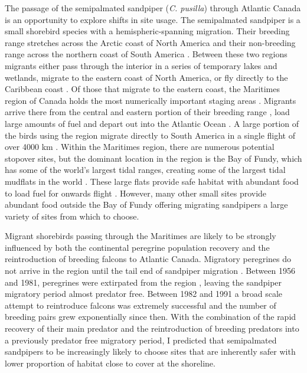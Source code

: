 The passage of the semipalmated sandpiper (\textit{C. pusilla}) through Atlantic Canada is an opportunity to explore shifts in site usage. The semipalmated sandpiper is a small shorebird species with a hemispheric-spanning migration. Their breeding range stretches across the Arctic coast of North America and their non-breeding range across the northern coast of South America \citep{hicklin2010semipalmated}. Between these two regions migrants either pass through the interior in a series of temporary lakes and wetlands, migrate to the eastern coast of North America, or fly directly to the Caribbean coast \citep{Brown2017}. Of those that migrate to the eastern coast, the Maritimes region of Canada holds the most numerically important staging areas \citep{Hicklin87}. Migrants arrive there from the central and eastern portion of their breeding range \citep{Brown2017}, load large amounts of fuel and depart out into the Atlantic Ocean \citep{Lank1983}. A large portion of the birds using the region migrate directly to South America in a single flight of over 4000 km \citep{Lank1979,Brown2017}. Within the Maritimes region, there are numerous potential stopover sites, but the dominant location in the region is the Bay of Fundy, which has some of the world's largest tidal ranges, creating some of the largest tidal mudflats in the world \citep{garrett1972tidal}. These large flats provide safe habitat with abundant food to load fuel for onwards flight \citep{Hicklin1984,Sprague2008a,Quinn2012a}. However, many other small sites provide abundant food outside the Bay of Fundy \citep{EnvironmentCanada2009} offering migrating sandpipers a large variety of sites from which to choose.

Migrant shorebirds passing through the Maritimes are likely to be strongly influenced by both the continental peregrine population recovery and the reintroduction of breeding falcons to Atlantic Canada. Migratory peregrines do not arrive in the region until the tail end of sandpiper migration \citep{Hope2011,Worcester2008}. Between 1956 and 1981, peregrines were extirpated from the region \citep{amirault20041995}, leaving the sandpiper migratory period almost predator free. Between 1982 and 1991 a broad scale attempt to reintroduce falcons was extremely successful and the number of breeding pairs grew exponentially since then. With the combination of the rapid recovery of their main predator and the reintroduction of breeding predators into a previously predator free migratory period, I predicted that semipalmated sandpipers to be increasingly likely to choose sites that are inherently safer with lower proportion of habitat close to cover at the shoreline.

